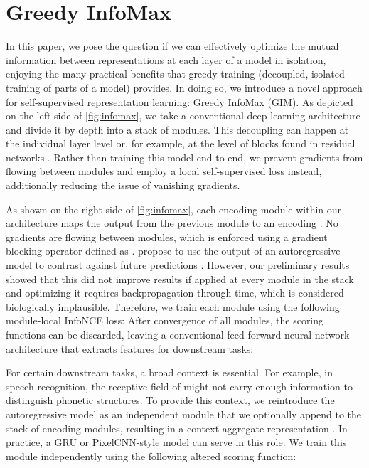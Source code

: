 \documentclass{article}
\begin{document}
\section{Greedy InfoMax} \label{sec:decouple}


In this paper, we pose the question if we can effectively optimize the mutual information between representations at each layer of a model in isolation, enjoying the many practical benefits that greedy training (decoupled, isolated training of parts of a model) provides. In doing so, we introduce a novel approach for self-supervised representation learning: Greedy InfoMax (GIM). As depicted on the left side of \cref{fig:infomax}, we take a conventional deep learning architecture and divide it by depth into a stack of  modules. This decoupling can happen at the individual layer level or, for example, at the level of blocks found in residual networks \citep{he2016identity}. Rather than training this model end-to-end, we prevent gradients from flowing between modules and employ a local self-supervised loss instead, additionally reducing the issue of vanishing gradients.



As shown on the right side of \cref{fig:infomax}, each encoding module  within our architecture maps the output from the previous module  to an encoding . No gradients are flowing between modules, which is enforced using a gradient blocking operator defined as  . \citet{oord2018representation} propose to use the output of an autoregressive model  to contrast against future predictions . However, our preliminary results showed that this did not improve results if applied at every module in the stack and optimizing it requires backpropagation through time, which is considered biologically implausible. Therefore, we train each module  using the following module-local InfoNCE loss: 
After convergence of all modules, the scoring functions  can be discarded, leaving a conventional feed-forward neural network architecture that extracts features  for downstream tasks:


For certain downstream tasks, a broad context is essential. For example, in speech recognition, the receptive field of  might not carry enough information to distinguish phonetic structures. To provide this context, we reintroduce the autoregressive model  as an independent module that we optionally append to the stack of encoding modules, resulting in a context-aggregate representation . In practice, a GRU or PixelCNN-style model can serve in this role. We train this module independently using the following altered scoring function:
\end{document}
